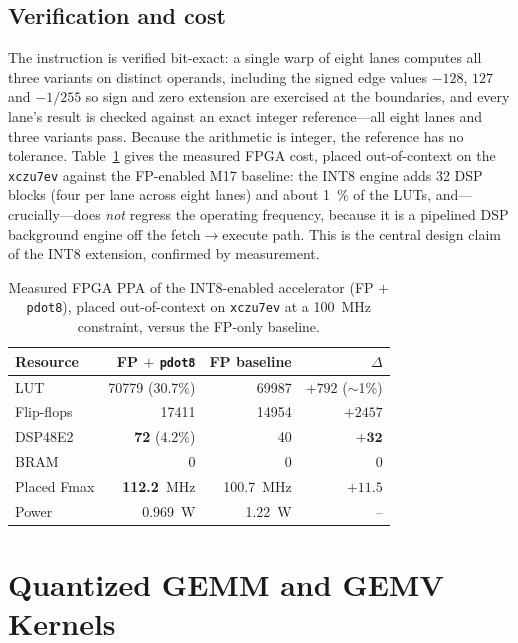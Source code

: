 \documentclass[12pt,a4paper,oneside]{report}
\newcommand{\code}[1]{\texttt{#1}}
\begin{document}
\section{Verification and cost}
The instruction is verified bit-exact: a single warp of eight lanes computes all
three variants on distinct operands, including the signed edge values $-128$, $127$
and $-1/255$ so sign and zero extension are exercised at the boundaries, and every
lane's result is checked against an exact integer reference---all eight lanes and
three variants pass. Because the arithmetic is integer, the reference has no
tolerance. Table~\ref{tab:ai_ppa} gives the measured FPGA cost, placed
out-of-context on the \code{xczu7ev} against the FP-enabled M17 baseline: the INT8
engine adds \num{32} DSP blocks (four per lane across eight lanes) and about
\SI{1}{\percent} of the LUTs, and---crucially---does \emph{not} regress the
operating frequency, because it is a pipelined DSP background engine off the
fetch$\rightarrow$execute path. This is the central design claim of the INT8
extension, confirmed by measurement.

\begin{table}[t]
\caption{Measured FPGA PPA of the INT8-enabled accelerator (FP $+$ \code{pdot8}),
placed out-of-context on \code{xczu7ev} at a \SI{100}{\mega\hertz} constraint,
versus the FP-only baseline.}
\label{tab:ai_ppa}
\centering
\small
\begin{tabular}{lrrr}
\toprule
Resource & FP $+$ \code{pdot8} & FP baseline & $\Delta$\\
\midrule
LUT          & \num{70779} (30.7\%) & \num{69987} & $+792$ ($\sim$1\%)\\
Flip-flops   & \num{17411}          & \num{14954} & $+2457$\\
DSP48E2      & \textbf{72} (4.2\%)  & 40          & $\mathbf{+32}$\\
BRAM         & 0                    & 0           & 0\\
Placed Fmax  & \textbf{112.2}~MHz   & 100.7~MHz   & $+11.5$\\
Power        & 0.969~W              & 1.22~W      & --\\
\bottomrule
\end{tabular}
\end{table}

\chapter{Quantized GEMM and GEMV Kernels}
\label{ch:gemm}
\end{document}

